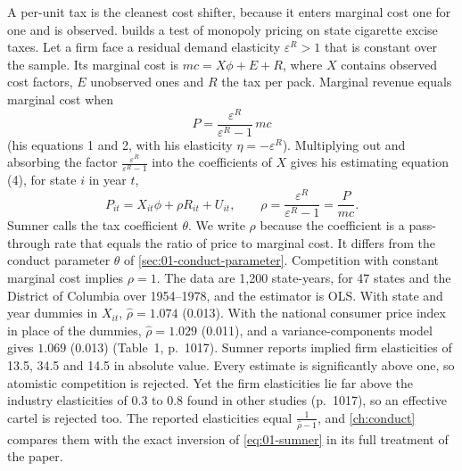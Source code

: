A per-unit tax is the cleanest cost shifter, because it enters marginal cost one for one and is observed.
\citet{Sumner1981} builds a test of monopoly pricing on state cigarette excise taxes. Let a firm face a residual
demand elasticity $\varepsilon^R > 1$ that is constant over the sample. Its marginal cost is $mc = X\phi + E + R$,
where $X$ contains observed cost factors, $E$ unobserved ones and $R$ the tax per pack. Marginal revenue equals
marginal cost when
\[
P = \frac{\varepsilon^R}{\varepsilon^R - 1}\, mc
\]
(his equations 1 and 2, with his elasticity $\eta = -\varepsilon^R$). Multiplying out and absorbing the factor
$\frac{\varepsilon^R}{\varepsilon^R - 1}$ into the coefficients of $X$ gives his estimating equation (4), for
state $i$ in year $t$,
\begin{equation}\label{eq:01-sumner}
P_{it} = X_{it}\phi + \rho R_{it} + U_{it}, \qquad \rho = \frac{\varepsilon^R}{\varepsilon^R - 1} = \frac{P}{mc} .
\end{equation}
Sumner calls the tax coefficient $\theta$. We write $\rho$ because the coefficient is a pass-through rate that
equals the ratio of price to marginal cost. It differs from the conduct parameter $\theta$ of
\cref{sec:01-conduct-parameter}. Competition with constant marginal cost implies $\rho = 1$. The data
are 1,200 state-years, for 47 states and the District of Columbia over 1954--1978, and the estimator is OLS. With
state and year dummies in $X_{it}$, $\hat\rho = 1.074$ (0.013). With the national consumer price index in place of
the dummies, $\hat\rho = 1.029$ (0.011), and a variance-components model gives $1.069$ (0.013) (Table~1,
p.~1017). Sumner reports implied firm elasticities of 13.5, 34.5 and 14.5 in absolute value. Every estimate is
significantly above one, so atomistic competition is rejected. Yet the firm elasticities lie far above the
industry elasticities of 0.3 to 0.8 found in other studies (p.~1017), so an effective cartel is rejected too.
The reported elasticities equal $\frac{1}{\hat\rho - 1}$, and \cref{ch:conduct} compares them with the exact
inversion of \eqref{eq:01-sumner} in its full treatment of the paper.

